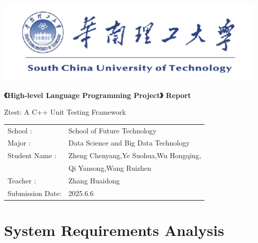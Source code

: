 \documentclass{article}
\begin{document}
\begin{titlepage}
    \centering
    \vspace*{1cm}

    \includegraphics[width=\textwidth]{img/logo.png} %

    \fontsize{24pt}{32pt}\selectfont
    \textbf{《High-level Language Programming Project》 Report}
    \vspace{4cm}

    \centering
    Ztest: A C++ Unit Testing Framework
    \vspace{2cm}

    \fontsize{16pt}{16pt}\selectfont
    \begin{tabular}{ll}                                                                \\
        School       :   & School of Future Technology\hspace{6cm}          \\
        Major        :   & Data Science and Big Data Technology\hspace{6cm} \\
        Student Name :   & Zheng Chenyang,Ye Suohua,Wu Hongqing,            \\
                         & Qi Yansong,Wang Ruizhen                          \\
        Teacher      :   & Zhang Huaidong\hspace{6cm}                       \\
        Submission Date: & 2025.6.6\hspace{6cm}                             \\
    \end{tabular}

    \vfill

    \vspace{1cm}
\end{titlepage}

\tableofcontents  %
\newpage
\section{System Requirements Analysis}
\end{document}

